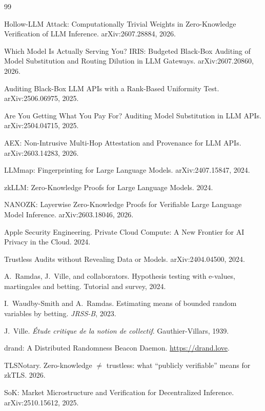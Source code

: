 \documentclass[11pt]{article}
\theoremstyle{definition}
\begin{document}
\begin{thebibliography}{99}\small

 Hollow-LLM Attack: Computationally Trivial Weights in
Zero-Knowledge Verification of LLM Inference. arXiv:2607.28884, 2026.

 Which Model Is Actually Serving You? IRIS: Budgeted Black-Box
Auditing of Model Substitution and Routing Dilution in LLM Gateways.
arXiv:2607.20860, 2026.

 Auditing Black-Box LLM APIs with a Rank-Based Uniformity Test.
arXiv:2506.06975, 2025.

 Are You Getting What You Pay For? Auditing Model Substitution
in LLM APIs. arXiv:2504.04715, 2025.

 AEX: Non-Intrusive Multi-Hop Attestation and Provenance for LLM
APIs. arXiv:2603.14283, 2026.

 LLMmap: Fingerprinting for Large Language Models.
arXiv:2407.15847, 2024.

 zkLLM: Zero-Knowledge Proofs for Large Language Models. 2024.

 NANOZK: Layerwise Zero-Knowledge Proofs for Verifiable Large
Language Model Inference. arXiv:2603.18046, 2026.

 Apple Security Engineering. Private Cloud Compute: A New Frontier
for AI Privacy in the Cloud. 2024.

 Trustless Audits without Revealing Data or Models.
arXiv:2404.04500, 2024.

 A.~Ramdas, J.~Ville, and collaborators. Hypothesis testing with
e-values, martingales and betting. Tutorial and survey, 2024.

 I.~Waudby-Smith and A.~Ramdas. Estimating means of bounded random
variables by betting. \emph{JRSS-B}, 2023.

 J.~Ville. \emph{\'Etude critique de la notion de collectif}.
Gauthier-Villars, 1939.

 drand: A Distributed Randomness Beacon Daemon.
\url{https://drand.love}.

 TLSNotary. Zero-knowledge $\neq$ trustless: what ``publicly
verifiable'' means for zkTLS. 2026.

 SoK: Market Microstructure and Verification for Decentralized
Inference. arXiv:2510.15612, 2025.

\end{thebibliography}
\end{document}
